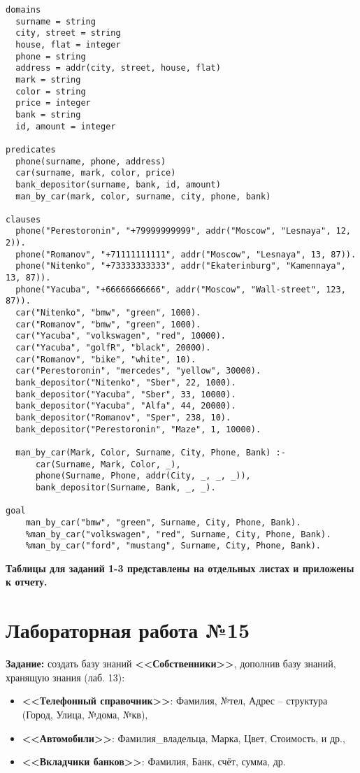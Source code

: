 \begin{lstlisting}
domains
  surname = string
  city, street = string
  house, flat = integer
  phone = string
  address = addr(city, street, house, flat)
  mark = string
  color = string
  price = integer
  bank = string
  id, amount = integer
  
predicates
  phone(surname, phone, address)
  car(surname, mark, color, price)
  bank_depositor(surname, bank, id, amount)
  man_by_car(mark, color, surname, city, phone, bank)
  
clauses
  phone("Perestoronin", "+79999999999", addr("Moscow", "Lesnaya", 12, 2)).
  phone("Romanov", "+71111111111", addr("Moscow", "Lesnaya", 13, 87)).
  phone("Nitenko", "+73333333333", addr("Ekaterinburg", "Kamennaya", 13, 87)).
  phone("Yacuba", "+66666666666", addr("Moscow", "Wall-street", 123, 87)).
  car("Nitenko", "bmw", "green", 1000).
  car("Romanov", "bmw", "green", 1000).
  car("Yacuba", "volkswagen", "red", 10000).
  car("Yacuba", "golfR", "black", 20000).
  car("Romanov", "bike", "white", 10).
  car("Perestoronin", "mercedes", "yellow", 30000).
  bank_depositor("Nitenko", "Sber", 22, 1000).
  bank_depositor("Yacuba", "Sber", 33, 10000).
  bank_depositor("Yacuba", "Alfa", 44, 20000).
  bank_depositor("Romanov", "Sper", 238, 10).
  bank_depositor("Perestoronin", "Maze", 1, 10000).
  
  man_by_car(Mark, Color, Surname, City, Phone, Bank) :- 
      car(Surname, Mark, Color, _),
      phone(Surname, Phone, addr(City, _, _, _)),
      bank_depositor(Surname, Bank, _, _).
  
goal
    man_by_car("bmw", "green", Surname, City, Phone, Bank).
    %man_by_car("volkswagen", "red", Surname, City, Phone, Bank).
    %man_by_car("ford", "mustang", Surname, City, Phone, Bank).
\end{lstlisting}

\textbf{Таблицы для заданий 1-3 представлены на отдельных листах и приложены к отчету.}

\chapter{Лабораторная работа №15}


\textbf{Задание:} создать базу знаний \textbf{<<Собственники>>}, дополнив базу знаний, хранящую знания (лаб. 13):

\begin{itemize}
    \item \textbf{<<Телефонный справочник>>}: Фамилия, №тел, Адрес – структура (Город, Улица, №дома, №кв),
    \item \textbf{<<Автомобили>>}: Фамилия\_владельца, Марка, Цвет, Стоимость, и др.,
    \item \textbf{<<Вкладчики банков>>}: Фамилия, Банк, счёт, сумма, др.
\end{itemize}

